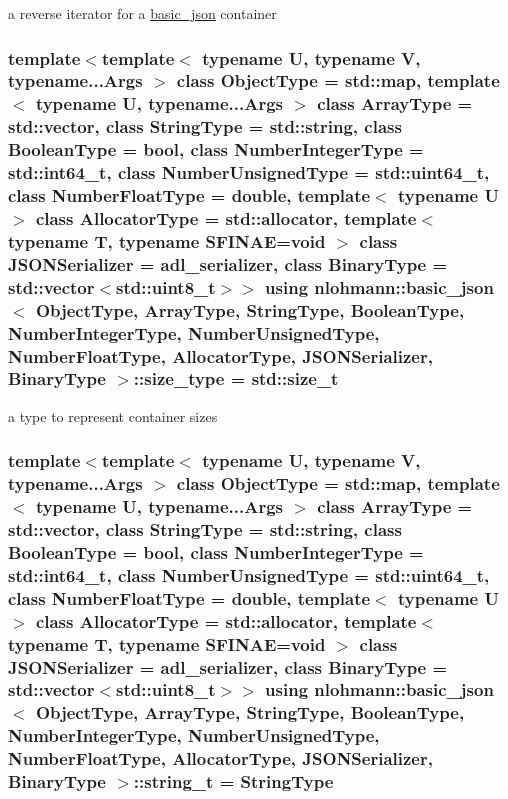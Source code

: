 a reverse iterator for a \hyperlink{classnlohmann_1_1basic__json}{basic\+\_\+json} container 

\subsubsection[{\texorpdfstring{size\+\_\+type}{size_type}}]{\setlength{\rightskip}{0pt plus 5cm}template$<$template$<$ typename U, typename V, typename...\+Args $>$ class Object\+Type = std\+::map, template$<$ typename U, typename...\+Args $>$ class Array\+Type = std\+::vector, class String\+Type  = std\+::string, class Boolean\+Type  = bool, class Number\+Integer\+Type  = std\+::int64\+\_\+t, class Number\+Unsigned\+Type  = std\+::uint64\+\_\+t, class Number\+Float\+Type  = double, template$<$ typename U $>$ class Allocator\+Type = std\+::allocator, template$<$ typename T, typename S\+F\+I\+N\+A\+E=void $>$ class J\+S\+O\+N\+Serializer = adl\+\_\+serializer, class Binary\+Type  = std\+::vector$<$std\+::uint8\+\_\+t$>$$>$ using {\bf nlohmann\+::basic\+\_\+json}$<$ Object\+Type, Array\+Type, String\+Type, Boolean\+Type, Number\+Integer\+Type, Number\+Unsigned\+Type, Number\+Float\+Type, Allocator\+Type, J\+S\+O\+N\+Serializer, Binary\+Type $>$\+::{\bf size\+\_\+type} =  std\+::size\+\_\+t}\hypertarget{classnlohmann_1_1basic__json_a3ada29bca70b4965f6fd37ec1c8f85f7}{}\label{classnlohmann_1_1basic__json_a3ada29bca70b4965f6fd37ec1c8f85f7}


a type to represent container sizes 

\subsubsection[{\texorpdfstring{string\+\_\+t}{string_t}}]{\setlength{\rightskip}{0pt plus 5cm}template$<$template$<$ typename U, typename V, typename...\+Args $>$ class Object\+Type = std\+::map, template$<$ typename U, typename...\+Args $>$ class Array\+Type = std\+::vector, class String\+Type  = std\+::string, class Boolean\+Type  = bool, class Number\+Integer\+Type  = std\+::int64\+\_\+t, class Number\+Unsigned\+Type  = std\+::uint64\+\_\+t, class Number\+Float\+Type  = double, template$<$ typename U $>$ class Allocator\+Type = std\+::allocator, template$<$ typename T, typename S\+F\+I\+N\+A\+E=void $>$ class J\+S\+O\+N\+Serializer = adl\+\_\+serializer, class Binary\+Type  = std\+::vector$<$std\+::uint8\+\_\+t$>$$>$ using {\bf nlohmann\+::basic\+\_\+json}$<$ Object\+Type, Array\+Type, String\+Type, Boolean\+Type, Number\+Integer\+Type, Number\+Unsigned\+Type, Number\+Float\+Type, Allocator\+Type, J\+S\+O\+N\+Serializer, Binary\+Type $>$\+::{\bf string\+\_\+t} =  String\+Type}\hypertarget{classnlohmann_1_1basic__json_a33593865ffb1860323dcbd52425b90c8}{}\label{classnlohmann_1_1basic__json_a33593865ffb1860323dcbd52425b90c8}


